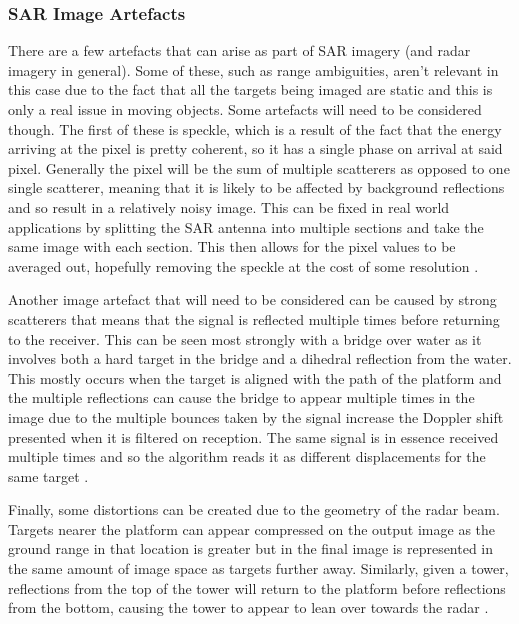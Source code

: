 \subsubsection{SAR Image Artefacts}
There are a few artefacts that can arise as part of SAR imagery (and radar imagery in general). Some of these, such as range ambiguities, aren't relevant in this case due to the fact that all the targets being imaged are static and this is only a real issue in moving objects. Some artefacts will need to be considered though. The first of these is speckle, which is a result of the fact that the energy arriving at the pixel is pretty coherent, so it has a single phase on arrival at said pixel. Generally the pixel will be the sum of multiple scatterers as opposed to one single scatterer, meaning that it is likely to be affected by background reflections and so result in a relatively noisy image. This can be fixed in real world applications by splitting the SAR antenna into multiple sections and take the same image with each section. This then allows for the pixel values to be averaged out, hopefully removing the speckle at the cost of some resolution \cite{richardsRemoteSensingImaging2009}. \par 
Another image artefact that will need to be considered can be caused by strong scatterers that means that the signal is reflected multiple times before returning to the receiver. This can be seen most strongly with a bridge over water as it involves both a hard target in the bridge and a dihedral reflection from the water. This mostly occurs when the target is aligned with the path of the platform and the multiple reflections can cause the bridge to appear multiple times in the image due to the multiple bounces taken by the signal increase the Doppler shift presented when it is filtered on reception. The same signal is in essence received multiple times and so the algorithm reads it as different displacements for the same target \cite{richardsRemoteSensingImaging2009}. \par
Finally, some distortions can be created due to the geometry of the radar beam. Targets nearer the platform can appear compressed on the output image as the ground range in that location is greater but in the final image is represented in the same amount of image space as targets further away. Similarly, given a tower, reflections from the top of the tower will return to the platform before reflections from the bottom, causing the tower to appear to lean over towards the radar \cite{richardsRemoteSensingImaging2009}.
